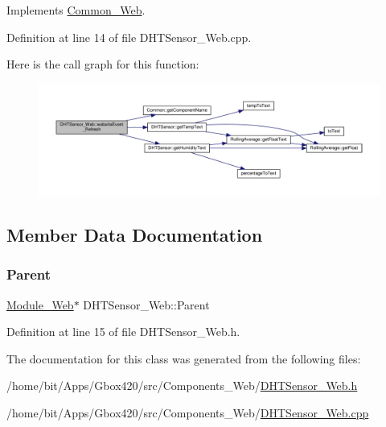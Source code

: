 Implements \hyperlink{class_common___web_aaca7c54fdcf908e4e1256b7b1f6fc212}{Common\+\_\+\+Web}.



Definition at line 14 of file D\+H\+T\+Sensor\+\_\+\+Web.\+cpp.

Here is the call graph for this function\+:
\nopagebreak
\begin{figure}[H]
\begin{center}
\leavevmode
\includegraphics[width=350pt]{class_d_h_t_sensor___web_ad02a0f5edd3f948ae81f9ebe6032d443_cgraph}
\end{center}
\end{figure}


\subsection{Member Data Documentation}
\mbox{\label{class_d_h_t_sensor___web_a5978d2c472c63dca58e9f9c83cc27ef0}} 
\subsubsection{\texorpdfstring{Parent}{Parent}}
{\footnotesize\ttfamily \hyperlink{class_module___web}{Module\+\_\+\+Web}$\ast$ D\+H\+T\+Sensor\+\_\+\+Web\+::\+Parent\hspace{0.3cm}{\ttfamily [protected]}}



Definition at line 15 of file D\+H\+T\+Sensor\+\_\+\+Web.\+h.



The documentation for this class was generated from the following files\+:\begin{DoxyCompactItemize}
\item 
/home/bit/\+Apps/\+Gbox420/src/\+Components\+\_\+\+Web/\hyperlink{_d_h_t_sensor___web_8h}{D\+H\+T\+Sensor\+\_\+\+Web.\+h}\item 
/home/bit/\+Apps/\+Gbox420/src/\+Components\+\_\+\+Web/\hyperlink{_d_h_t_sensor___web_8cpp}{D\+H\+T\+Sensor\+\_\+\+Web.\+cpp}\end{DoxyCompactItemize}
